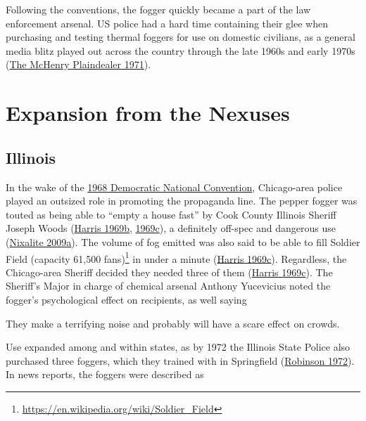 \documentclass[
  11pt,
]{krantz}
\renewenvironment{quote}{\begin{VF}}{\end{VF}}
\renewcommand{\href}[2]{#2\footnote{\url{#1}}}
\begin{document}
Following the conventions, the fogger quickly became a part of the law enforcement arsenal.
US police had a hard time containing their glee when purchasing and testing thermal foggers for use on domestic civilians, as a general media blitz played out across the country through the late 1960s and early 1970s (\protect\hyperlink{ref-PlainDealer1971}{The McHenry Plaindealer 1971}).

\hypertarget{expansion-from-the-nexuses}{%
\section{Expansion from the Nexuses}\label{expansion-from-the-nexuses}}

\hypertarget{illinois}{%
\subsection{Illinois}\label{illinois}}

In the wake of the \protect\hyperlink{ChicagoIL1968_08_26}{1968 Democratic National Convention}, Chicago-area police played an outsized role in promoting the propaganda line.
The pepper fogger was touted as being able to ``empty a house fast'' by Cook County Illinois Sheriff Joseph Woods (\protect\hyperlink{ref-MtVernonRegisterNews1969_04_09}{Harris 1969b}, \protect\hyperlink{ref-DailyDispatch1969_04_09}{1969c}), a definitely off-spec and dangerous use (\protect\hyperlink{ref-Nixalite2009b}{Nixalite 2009a}).
The volume of fog emitted was also said to be able to fill \href{https://en.wikipedia.org/wiki/Soldier_Field}{Soldier Field (capacity 61,500 fans)} in under a minute (\protect\hyperlink{ref-DailyDispatch1969_04_09}{Harris 1969c}).
Regardless, the Chicago-area Sheriff decided they needed three of them (\protect\hyperlink{ref-DailyDispatch1969_04_09}{Harris 1969c}).
The Sheriff's Major in charge of chemical arsenal Anthony Yucevicius noted the fogger's psychological effect on recipients, as well saying

\begin{quote}
They make a terrifying noise and probably will have a scare effect on crowds.

\end{quote}

Use expanded among and within states, as by 1972 the Illinois State Police also purchased three foggers, which they trained with in Springfield (\protect\hyperlink{ref-Robinson1972}{Robinson 1972}).
In news reports, the foggers were described as
\end{document}
